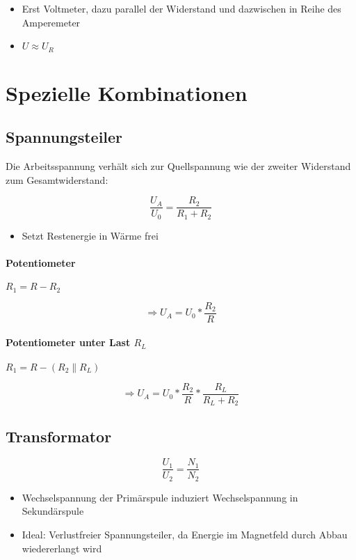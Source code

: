 \begin{itemize}
  \item Erst Voltmeter, dazu parallel der Widerstand und dazwischen in Reihe des Amperemeter
  \item $U \approx U_R$
\end{itemize}

\section{Spezielle Kombinationen}

\subsection{Spannungsteiler}

Die Arbeitsspannung verhält sich zur Quellspannung wie der zweiter Widerstand zum Gesamtwiderstand:

$$\frac{U_A}{U_0} = \frac{R_2}{R_1 + R_2}$$

\begin{itemize}
  \item Setzt Restenergie in Wärme frei
\end{itemize}

\paragraph{Potentiometer} $R_1 = R - R_2$

$$\Rightarrow U_A = U_0 * \frac{R_2}{R}$$

\paragraph{Potentiometer unter Last $R_L$}
$R_1 = R - (R_2 \parallel R_L)$

$$\Rightarrow U_A = U_0 * \frac{R_2}{R} * \frac{R_L}{R_L + R_2}$$

\subsection{Transformator}

$$\frac{U_1}{U_2} = \frac{N_1}{N_2}$$

\begin{itemize}
  \item Wechselspannung der Primärspule induziert Wechselspannung in Sekundärspule
  \item Ideal: Verlustfreier Spannungsteiler, da Energie im Magnetfeld durch Abbau wiedererlangt wird
\end{itemize}

